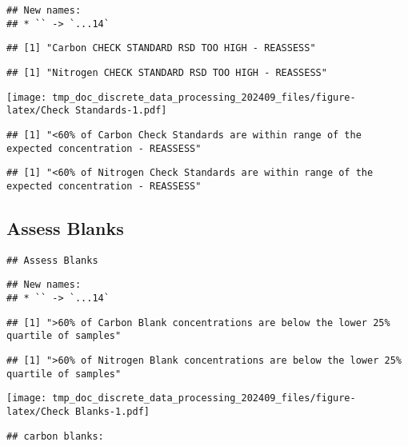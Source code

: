 \documentclass[
]{article}
\begin{document}
\begin{verbatim}
## New names:
## * `` -> `...14`
\end{verbatim}

\begin{verbatim}
## [1] "Carbon CHECK STANDARD RSD TOO HIGH - REASSESS"
\end{verbatim}

\begin{verbatim}
## [1] "Nitrogen CHECK STANDARD RSD TOO HIGH - REASSESS"
\end{verbatim}

\texttt{[image: tmp\_doc\_discrete\_data\_processing\_202409\_files/figure-latex/Check Standards-1.pdf]}

\begin{verbatim}
## [1] "<60% of Carbon Check Standards are within range of the expected concentration - REASSESS"
\end{verbatim}

\begin{verbatim}
## [1] "<60% of Nitrogen Check Standards are within range of the expected concentration - REASSESS"
\end{verbatim}

\newpage

\hypertarget{assess-blanks}{%
\subsection{Assess Blanks}\label{assess-blanks}}

\begin{verbatim}
## Assess Blanks
\end{verbatim}

\begin{verbatim}
## New names:
## * `` -> `...14`
\end{verbatim}

\begin{verbatim}
## [1] ">60% of Carbon Blank concentrations are below the lower 25% quartile of samples"
\end{verbatim}

\begin{verbatim}
## [1] ">60% of Nitrogen Blank concentrations are below the lower 25% quartile of samples"
\end{verbatim}

\texttt{[image: tmp\_doc\_discrete\_data\_processing\_202409\_files/figure-latex/Check Blanks-1.pdf]}

\begin{verbatim}
## carbon blanks:
\end{verbatim}
\end{document}
